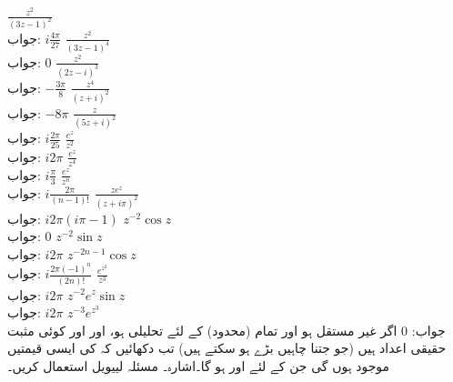 \quad
$\tfrac{z^2}{(3z-1)^2}$\\
جواب:\quad
$i\tfrac{4\pi}{27}$
\quad
$\tfrac{z^2}{(3z-1)^4}$\\
جواب:\quad
$0$
\quad
$\tfrac{z^2}{(2z-i)^3}$\\
جواب:\quad
$-\tfrac{3\pi}{8}$
\quad
$\tfrac{z^4}{(z+i)^2}$\\
جواب:\quad
$-8\pi$
\quad
$\tfrac{z}{(5z+i)^2}$\\
جواب:\quad
$i\tfrac{2\pi}{25}$
\quad
$\tfrac{e^z}{z^2}$\\
جواب:\quad
$i2\pi$
\quad
$\tfrac{e^z}{z^4}$\\
جواب:\quad
$i\tfrac{\pi}{3}$
\quad
$\tfrac{e^z}{z^n}$\\
جواب:\quad
$i\tfrac{2\pi}{(n-1)!}$
\quad
$\tfrac{ze^z}{(z+i\pi)^2}$\\
جواب:\quad
$i2\pi(i\pi-1)$
\quad
$z^{-2}\cos z$\\
جواب:\quad
$0$
\quad
$z^{-2}\sin z$\\
جواب:\quad
$i2\pi$
\quad
$z^{-2n-1}\cos z$\\
جواب:\quad
$i\tfrac{2\pi (-1)^n}{(2n)!}$
\quad
$\tfrac{e^{z^2}}{z^3}$\\
جواب:\quad
$i2\pi$
\quad
$z^{-2}e^z\sin z$\\
جواب:\quad
$i2\pi$
\quad
$z^{-3}e^{z^3}$\\
جواب:\quad
$0$
\quad
اگر  غیر مستقل ہو اور تمام (محدود)  کے لئے تحلیلی ہو، اور  اور  کوئی مثبت حقیقی اعداد ہیں (جو جتنا چاہیں بڑے ہو سکتے ہیں) تب دکھائیں کہ  کی ایسی قیمتیں موجود ہوں گی جن کے لئے  اور  ہو گا۔اشارہ۔ مسئلہ لییویل استعمال کریں۔
